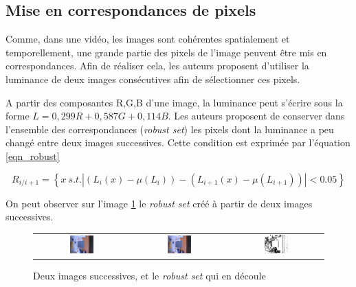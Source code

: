 \subsection{Mise en correspondances de pixels}
Comme, dans une vidéo, les images sont cohérentes spatialement et temporellement, une grande partie des pixels de l'image peuvent être mis en correspondances. Afin de réaliser cela, les auteurs proposent d'utiliser la luminance de deux images consécutives afin de sélectionner ces pixels.

A partir des composantes R,G,B d'une image, la luminance peut s'écrire sous la forme $L = 0,299 R + 0,587 G + 0,114 B$. Les auteurs proposent de conserver dans l'ensemble des correspondances (\textit{robust set}) les pixels dont la luminance a peu changé entre deux images successives. Cette condition est exprimée par l'équation \ref{eqn_robust}

\begin{equation}
R_{i/i+1} = \left\{x \: s.t. |(L_{i}(x)-\mu(L_{i})) - (L_{i+1}(x)-\mu(L_{i+1}))| < 0.05 \right\}
\label{eqn_robust}
\end{equation}

On peut observer sur l'image \ref{fig_robust} le \textit{robust set} créé à partir de deux images successives.

\begin{figure}[H]
\centering
\begin{tabular}{ccc}
\includegraphics[width = 0.27\textwidth]{Chapters/Images/rs1}&
\includegraphics[width = 0.27\textwidth]{Chapters/Images/rs2}&
\includegraphics[width = 0.27\textwidth]{Chapters/Images/rs3}
\end{tabular}
\caption{Deux images successives, et le \textit{robust set} qui en découle}
\label{fig_robust}
\end{figure}

